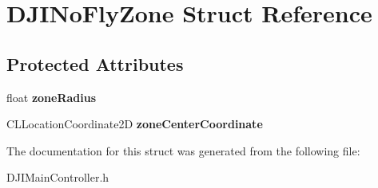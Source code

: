 \hypertarget{struct_d_j_i_no_fly_zone}{\section{D\+J\+I\+No\+Fly\+Zone Struct Reference}
\label{struct_d_j_i_no_fly_zone}
}
\subsection*{Protected Attributes}
\begin{DoxyCompactItemize}
\item 
\hypertarget{struct_d_j_i_no_fly_zone_a835cc06cf44d2ec55ea722620e3a6a3e}{float {\bfseries zone\+Radius}}\label{struct_d_j_i_no_fly_zone_a835cc06cf44d2ec55ea722620e3a6a3e}

\item 
\hypertarget{struct_d_j_i_no_fly_zone_ac4dc5a958fa296e208d4d03a2a11f7b4}{C\+L\+Location\+Coordinate2\+D {\bfseries zone\+Center\+Coordinate}}\label{struct_d_j_i_no_fly_zone_ac4dc5a958fa296e208d4d03a2a11f7b4}

\end{DoxyCompactItemize}


The documentation for this struct was generated from the following file\+:\begin{DoxyCompactItemize}
\item 
D\+J\+I\+Main\+Controller.\+h\end{DoxyCompactItemize}
